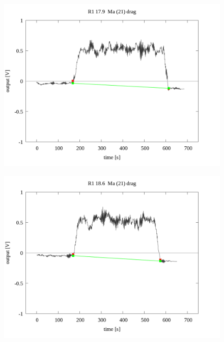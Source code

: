\documentclass[a4paper]{jsarticle}
\begin{document}
\begin{figure}[htbp]
    \footnotesize
    \begin{center}
        \includegraphics[width=140mm]{../../../../33_result/210806/moving_average/21/drag/03/R1_17.9_ma(21)_drag_03.png}
    \end{center}
\end{figure}

\begin{figure}[htbp]
    \footnotesize
    \begin{center}
        \includegraphics[width=140mm]{../../../../33_result/210806/moving_average/21/drag/03/R1_18.6_ma(21)_drag_03.png}
    \end{center}
\end{figure}
\end{document}
